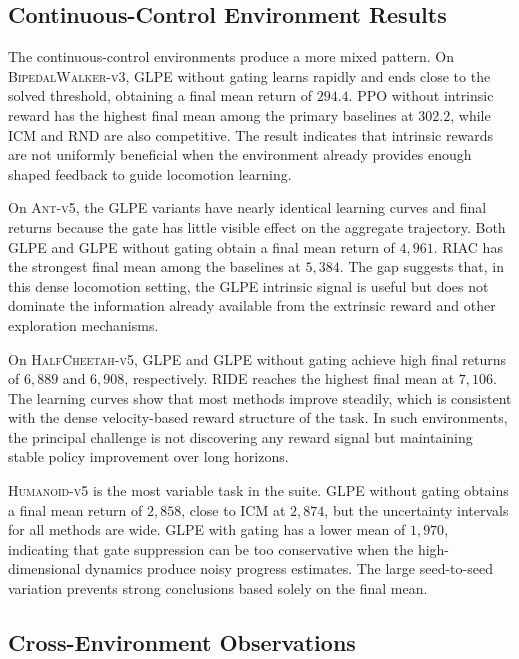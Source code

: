 \subsection{Continuous-Control Environment Results}
\label{subsec:results_continuous_control}

The continuous-control environments produce a more mixed pattern.
On \textsc{BipedalWalker-v3}, GLPE without gating learns rapidly and ends close to the solved threshold, obtaining a final mean return of $294.4$.
PPO without intrinsic reward has the highest final mean among the primary baselines at $302.2$, while ICM and RND are also competitive.
The result indicates that intrinsic rewards are not uniformly beneficial when the environment already provides enough shaped feedback to guide locomotion learning.

On \textsc{Ant-v5}, the GLPE variants have nearly identical learning curves and final returns because the gate has little visible effect on the aggregate trajectory.
Both GLPE and GLPE without gating obtain a final mean return of $4{,}961$.
RIAC has the strongest final mean among the baselines at $5{,}384$.
The gap suggests that, in this dense locomotion setting, the GLPE intrinsic signal is useful but does not dominate the information already available from the extrinsic reward and other exploration mechanisms.

On \textsc{HalfCheetah-v5}, GLPE and GLPE without gating achieve high final returns of $6{,}889$ and $6{,}908$, respectively.
RIDE reaches the highest final mean at $7{,}106$.
The learning curves show that most methods improve steadily, which is consistent with the dense velocity-based reward structure of the task.
In such environments, the principal challenge is not discovering any reward signal but maintaining stable policy improvement over long horizons.

\textsc{Humanoid-v5} is the most variable task in the suite.
GLPE without gating obtains a final mean return of $2{,}858$, close to ICM at $2{,}874$, but the uncertainty intervals for all methods are wide.
GLPE with gating has a lower mean of $1{,}970$, indicating that gate suppression can be too conservative when the high-dimensional dynamics produce noisy progress estimates.
The large seed-to-seed variation prevents strong conclusions based solely on the final mean.

\subsection{Cross-Environment Observations}
\label{subsec:results_cross_environment}


